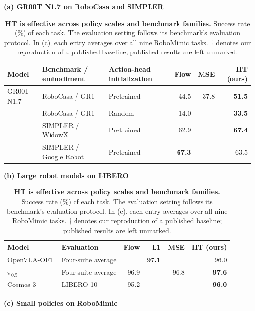 \begin{table}[t]
  \centering
  \caption{\textbf{HT is effective across policy scales and benchmark families.}
  Success rate (\%) of each task. The evaluation setting follows its benchmark's evaluation protocol. In (c), each entry averages over all nine RoboMimic tasks. $\dagger$ denotes our reproduction of a published baseline; published results are left unmarked.}
  \label{tab:main-performance}
  \small
  \setlength{\tabcolsep}{5pt}
  \renewcommand{\arraystretch}{1.08}

  \textbf{(a) GR00T N1.7 on RoboCasa and SIMPLER}

  \vspace{2pt}
  \begin{tabular*}{\textwidth}{@{\extracolsep{\fill}}lllrrr@{}}
    \toprule
    Model & Benchmark / embodiment & Action-head initialization
          & Flow & MSE & HT (ours) \\
    \midrule
    GR00T N1.7 & RoboCasa / GR1          & Pretrained & 44.5 & 37.8 & \textbf{51.5} \\
               & RoboCasa / GR1          & Random     & 14.0 &      & \textbf{33.5} \\
               & SIMPLER / WidowX        & Pretrained &  62.9\rlap{$^\dagger$} &      & \textbf{67.4} \\
               & SIMPLER / Google Robot  & Pretrained & \textbf{67.3}\rlap{$^\dagger$} & & 63.5 \\
    \bottomrule
  \end{tabular*}

  \vspace{7pt}
  \textbf{(b) Large robot models on LIBERO}

  \vspace{2pt}
  \begin{tabular*}{\textwidth}{@{\extracolsep{\fill}}llrrrr@{}}
    \toprule
    Model & Evaluation & Flow & L1 & MSE & HT (ours) \\
    \midrule
    OpenVLA-OFT & Four-suite average &      & \textbf{97.1} &      & 96.0 \\
    $\pi_{0.5}$ & Four-suite average & 96.9 & -- & 96.8 & \textbf{97.6} \\
    Cosmos 3    & LIBERO-10          & 95.2 & -- & & \textbf{96.0} \\
    \bottomrule
  \end{tabular*}

  \vspace{7pt}
  \textbf{(c) Small policies on RoboMimic}


\end{table}
